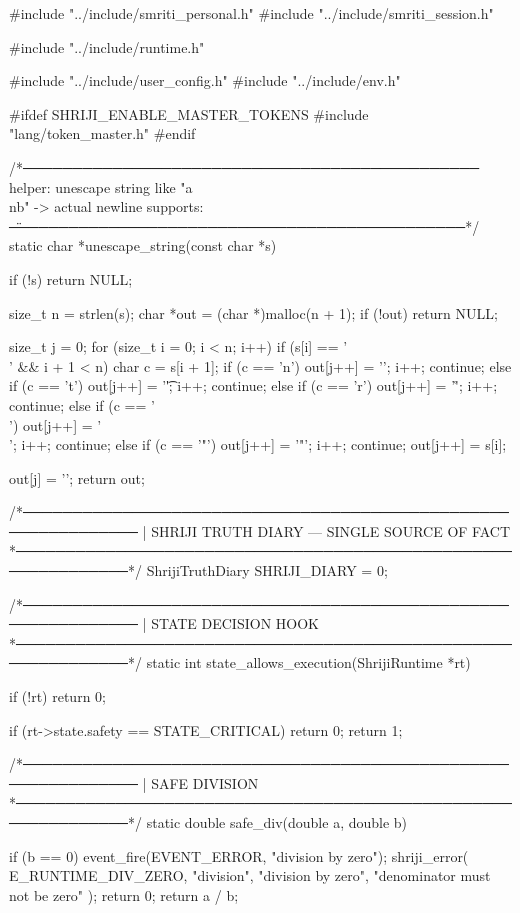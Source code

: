\documentclass{article}
\begin{document}
#include "../include/smriti_personal.h"
#include "../include/smriti_session.h"

#include "../include/runtime.h"

#include "../include/user_config.h"
#include "../include/env.h"

#ifdef SHRIJI_ENABLE_MASTER_TOKENS
#include "lang/token_master.h"
#endif

/*──────────────────────────────────────────────
  helper: unescape string like "a\\nb" -> actual newline
  supports: \n \t \r \\ \"
──────────────────────────────────────────────*/
static char *unescape_string(const char *s)
{
    if (!s) return NULL;

    size_t n = strlen(s);
    char *out = (char *)malloc(n + 1);
    if (!out) return NULL;

    size_t j = 0;
    for (size_t i = 0; i < n; i++) {
        if (s[i] == '\\' && i + 1 < n) {
            char c = s[i + 1];
            if (c == 'n')      { out[j++] = '\n'; i++; continue; }
            else if (c == 't') { out[j++] = '\t'; i++; continue; }
            else if (c == 'r') { out[j++] = '\r'; i++; continue; }
            else if (c == '\\'){ out[j++] = '\\'; i++; continue; }
            else if (c == '"') { out[j++] = '"';  i++; continue; }
        }
        out[j++] = s[i];
    }

    out[j] = '\0';
    return out;
}
/*──────────────────────────────────────────────────────────────
 | SHRIJI TRUTH DIARY — SINGLE SOURCE OF FACT
 *──────────────────────────────────────────────────────────────*/
ShrijiTruthDiary SHRIJI_DIARY = {0};

/*──────────────────────────────────────────────────────────────
 | STATE DECISION HOOK
 *──────────────────────────────────────────────────────────────*/
static int state_allows_execution(ShrijiRuntime *rt)
{
    if (!rt) return 0;

    if (rt->state.safety == STATE_CRITICAL) {
        return 0;
    }
    return 1;
}

/*──────────────────────────────────────────────────────────────
 | SAFE DIVISION
 *──────────────────────────────────────────────────────────────*/
static double safe_div(double a, double b)

{
    if (b == 0) {
        event_fire(EVENT_ERROR, "division by zero");
        shriji_error(
            E_RUNTIME_DIV_ZERO,
            "division",
            "division by zero",
            "denominator must not be zero"
        );
        return 0;
    }
    return a / b;
}
\end{document}
